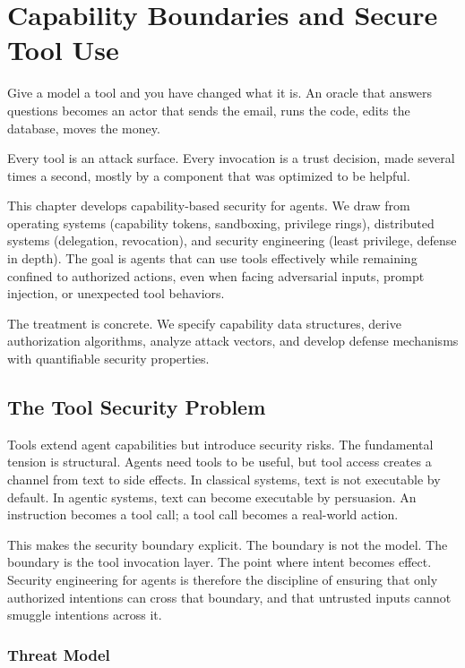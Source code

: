 \chapter{Capability Boundaries and Secure Tool Use}
\label{ch:capability}

Give a model a tool and you have changed what it is. An oracle that answers
questions becomes an actor that sends the email, runs the code, edits the
database, moves the money.

Every tool is an attack surface. Every invocation is a trust decision, made
several times a second, mostly by a component that was optimized to be helpful.

This chapter develops capability-based security for agents. We draw from operating systems (capability tokens, sandboxing, privilege rings), distributed systems (delegation, revocation), and security engineering (least privilege, defense in depth). The goal is agents that can use tools effectively while remaining confined to authorized actions, even when facing adversarial inputs, prompt injection, or unexpected tool behaviors.

The treatment is concrete. We specify capability data structures, derive authorization algorithms, analyze attack vectors, and develop defense mechanisms with quantifiable security properties.

\section{The Tool Security Problem}

Tools extend agent capabilities but introduce security risks. The fundamental tension is structural. Agents need tools to be useful, but tool access creates a channel from text to side effects. In classical systems, text is not executable by default. In agentic systems, text can become executable by persuasion. An instruction becomes a tool call; a tool call becomes a real-world action.

This makes the security boundary explicit. The boundary is not the model. The boundary is the tool invocation layer. The point where intent becomes effect. Security engineering for agents is therefore the discipline of ensuring that only authorized intentions can cross that boundary, and that untrusted inputs cannot smuggle intentions across it.

\subsection{Threat Model}

